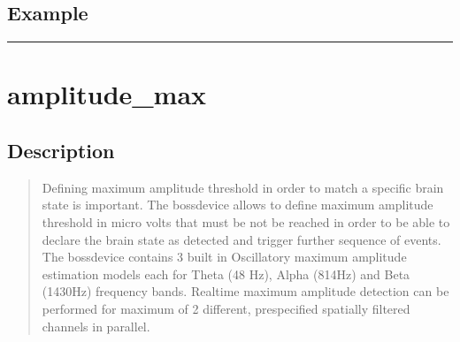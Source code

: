 \documentclass[letterpaper,10pt,english]{sphinxmanual}
\begin{document}
\subsection{Example}
\label{\detokenize{4_api_documentation:id31}}
\begin{sphinxVerbatim}[commandchars=\\\{\}]
 
 
\end{sphinxVerbatim}


\bigskip\hrule\bigskip



\section{amplitude\_max}
\label{\detokenize{4_api_documentation:amplitude-max}}

\subsection{Description}
\label{\detokenize{4_api_documentation:id32}}\begin{quote}

Defining maximum amplitude threshold in order to match a specific brain state is important. The bossdevice allows to define maximum amplitude threshold in micro volts that must be not be reached in order to be able to declare the brain state as detected and trigger further sequence of events. The bossdevice contains 3 built in Oscillatory maximum amplitude estimation models each for Theta (4\sphinxhyphen{}8 Hz), Alpha (8\sphinxhyphen{}14Hz) and Beta (14\sphinxhyphen{}30Hz) frequency bands. Real\sphinxhyphen{}time maximum amplitude detection can be performed for maximum of 2 different, pre\sphinxhyphen{}specified spatially filtered channels in parallel.
\end{quote}
\end{document}
